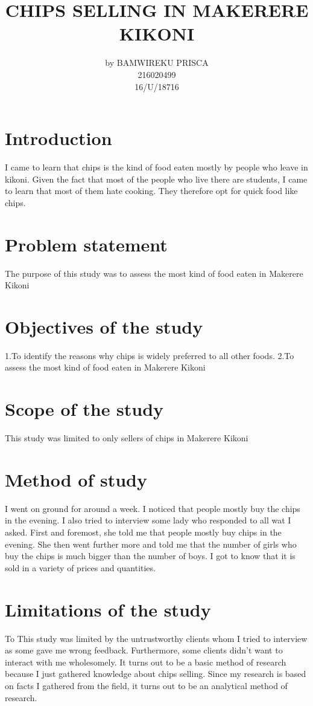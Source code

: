 \documentclass[10pt,letterpaper]{article}
\begin{document}
\title{CHIPS SELLING IN MAKERERE KIKONI}
\author{by BAMWIREKU PRISCA   \\ 216020499 \\  16/U/18716}
\maketitle
\section{Introduction }
I came to learn that chips is the kind of food eaten mostly by people who leave in kikoni. Given the fact that most of the people who live there are students, I came to learn that most of them hate cooking. They therefore opt for quick food like chips.
\section{Problem statement }
The purpose of this study was to assess the most kind of food eaten in Makerere Kikoni
\section{Objectives of the study}
1.To identify the reasons why chips is widely preferred to all other foods.
2.To assess the most kind of food eaten in Makerere Kikoni

\section{Scope of the study}
This study was limited to only sellers of chips in Makerere Kikoni 
\section{Method of study}
I went on ground for around a week. I noticed that people mostly buy the chips in the evening. I also tried to interview some lady who responded to all wat I asked. First and foremost, she told me that people mostly buy chips in the evening. She then went further more and told me that the number of girls who buy the chips is much bigger than the number of boys. I got to know that it is sold in a variety of prices and quantities.
\section{Limitations of the study}
To This study was limited by the untrustworthy clients whom I tried to interview as some gave me wrong feedback. Furthermore, some clients didn’t want to interact with me wholesomely.
It turns out to be a basic method of research because I just gathered knowledge about chips selling. Since my research is based on facts I gathered from the field, it turns out to be an analytical method of research.
\end{document}
